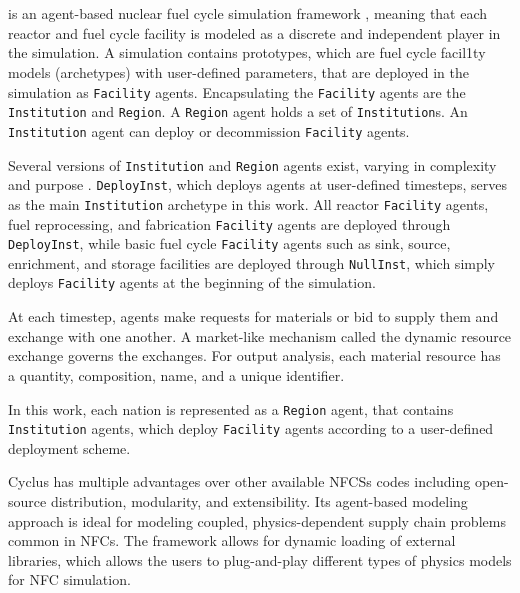 \section{\Cyclus}

\Cyclus is an agent-based nuclear fuel cycle simulation framework 
\cite{huff_fundamental_2016}, meaning
that each reactor and fuel cycle facility is modeled as a discrete and independent
player in the simulation.
A \Cyclus simulation contains prototypes, which are fuel cycle facil1ty models (archetypes) with
user-defined parameters, that are deployed in the simulation as \texttt{Facility} agents.
Encapsulating the \texttt{Facility} agents are the \texttt{Institution} and \texttt{Region}.
A \texttt{Region} agent holds a set of \texttt{Institution}s. 
An \texttt{Institution} agent can deploy or decommission \texttt{Facility} agents.

Several versions of \texttt{Institution}
and \texttt{Region} agents exist, varying in complexity and purpose \cite{huff_extensions_2014}.
\texttt{DeployInst}, which deploys agents at user-defined timesteps, serves
as the main \texttt{Institution} archetype in this work. All reactor \texttt{Facility} agents,
fuel reprocessing, and fabrication \texttt{Facility} agents
are deployed through \texttt{DeployInst}, while basic fuel cycle \texttt{Facility} agents
such as sink, source, enrichment, and storage facilities are deployed 
through \texttt{NullInst}, which simply deploys \texttt{Facility}
agents at the beginning of the simulation.

At each timestep,
agents make requests for materials or bid to supply them and exchange
with one another. A market-like mechanism called the dynamic resource exchange
\cite{gidden_methodology_2016} governs the exchanges.
For output analysis, each material resource has a quantity, composition, name, and a unique identifier.

In this work, each nation is represented as a \texttt{Region} agent,
that contains \texttt{Institution} agents, which deploy \texttt{Facility} 
agents according to a user-defined deployment scheme.

Cyclus has multiple advantages over other available
\glspl{NFCS} codes including open-source distribution, modularity,
and extensibility. Its agent-based modeling approach
is ideal for modeling coupled, physics-dependent
supply chain problems common in \glspl{NFC}.
The framework allows for dynamic loading of 
external libraries, which allows the users to plug-and-play
different types of physics models for \gls{NFC}
simulation.

